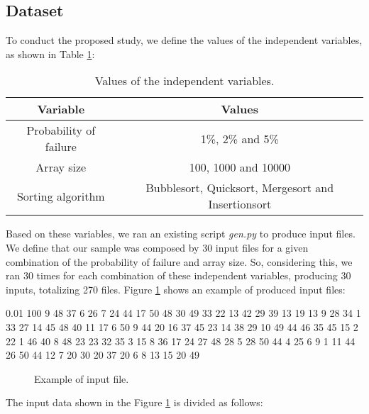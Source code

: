 \subsection{Dataset}

To conduct the proposed study, we define the values of the independent variables, as shown in Table \ref{table-independent-variables-values}:

\begin{table}[H]
    \caption{Values of the independent variables.}
    \begin{center}
    \begin{tabular}{|c|c|}
    \hline
    \textbf{Variable} & \textbf{Values} \\
    \hline
    Probability of failure & 1\%, 2\% and 5\% \\
    \hline
    Array size & 100, 1000 and 10000 \\
    \hline
    Sorting algorithm & Bubblesort, Quicksort, Mergesort and Insertionsort \\
    \hline
    \end{tabular}
    \label{table-independent-variables-values}
    \end{center}
\end{table}

Based on these variables, we ran an existing script \textit{gen.py} to produce input files. We define that our sample was composed by 30 input files for a given combination of the probability of failure and array size. So, considering this, we ran 30 times for each combination of these independent variables, producing 30 inputs, totalizing 270 files. Figure \ref{fig-input-file-example} shows an example of produced input files:

\begin{verbbox}[\mbox{}]
0.01 100 9 48 37 6 26 7 24 44 17 50 48 30 49 33 22 13 42 29 39 13 19 13 9 28 
34 1 33 27 14 45 48 40 11 17 6 50 9 44 20 16 37 45 23 14 38 29 10 49 44 46 35
45 15 2 22 1 46 40 8 48 23 23 32 35 3 15 8 36 17 24 27 48 28 5 28 50 44 4 25 
6 9 1 11 44 26 50 44 12 7 20 30 20 37 20 6 8 13 15 20 49
\end{verbbox}

\begin{figure}[H]
    \centering
    \fbox{
    \theverbbox
    }
    \caption{Example of input file.}
    \label{fig-input-file-example}
\end{figure}

The input data shown in the Figure \ref{fig-input-file-example} is divided as follows:

